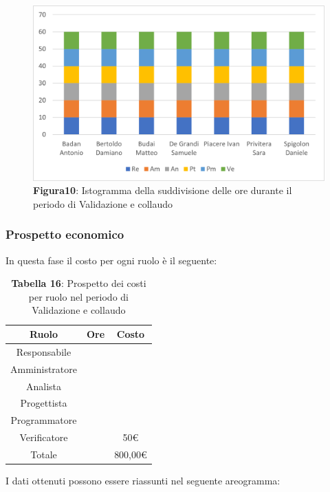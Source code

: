\begin{figure}[H]
	\centering
	\includegraphics[width=0.7\linewidth]{res/images/Figura10.png}
	\caption*{\textbf{Figura10}: Istogramma della suddivisione delle ore durante il periodo di Validazione e collaudo}
	\label{fig:Figura10}
\end{figure}
	
	
\subsubsection{Prospetto economico}
In questa fase il costo per ogni ruolo è il seguente:

\begin{table}[H]
	\centering
	\renewcommand{\arraystretch}{1.5}
	\begin{tabular}{|c|c|c|}
		\hline
		\rowcolor{lighter-grayer}
		Ruolo & Ore & Costo \\
		\hline
		Responsabile &  &  \\
		\hline
		Amministratore &  &  \\
		\hline
		Analista &  &  \\
		\hline
		Progettista&  &  \\
		\hline
		Programmatore &  &  \\
		\hline
		Verificatore &  & 50\euro \\
		\hline
		Totale &  &  800,00\euro \\
		\hline
	\end{tabular}
\caption*{\textbf{Tabella 16}: Prospetto dei costi per ruolo nel periodo di Validazione e collaudo\\}
\end{table}

I dati ottenuti possono essere riassunti nel seguente areogramma:



